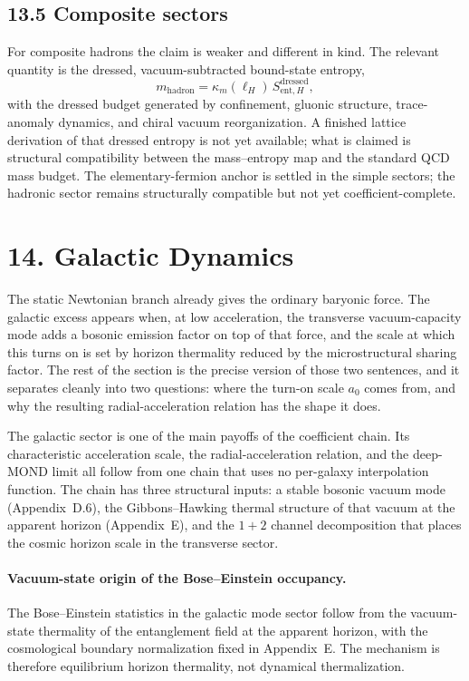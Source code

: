 \documentclass[11pt]{article}
\begin{document}
\subsection{13.5 Composite sectors}

For composite hadrons the claim is weaker and different in kind. The relevant quantity is the dressed, vacuum-subtracted bound-state entropy,
\[
m_{\mathrm{hadron}}=\kappa_m(\ell_H)\,S_{\mathrm{ent},H}^{\mathrm{dressed}},
\]
with the dressed budget generated by confinement, gluonic structure, trace-anomaly dynamics, and chiral vacuum reorganization. A finished lattice derivation of that dressed entropy is not yet available; what is claimed is structural compatibility between the mass--entropy map and the standard QCD mass budget. The elementary-fermion anchor is settled in the simple sectors; the hadronic sector remains structurally compatible but not yet coefficient-complete.

\section{14. Galactic Dynamics}

The static Newtonian branch already gives the ordinary baryonic force. The galactic excess appears when, at low acceleration, the transverse vacuum-capacity mode adds a bosonic emission factor on top of that force, and the scale at which this turns on is set by horizon thermality reduced by the microstructural sharing factor. The rest of the section is the precise version of those two sentences, and it separates cleanly into two questions: where the turn-on scale $a_0$ comes from, and why the resulting radial-acceleration relation has the shape it does.

The galactic sector is one of the main payoffs of the coefficient chain. Its characteristic acceleration scale, the radial-acceleration relation, and the deep-MOND limit all follow from one chain that uses no per-galaxy interpolation function. The chain has three structural inputs: a stable bosonic vacuum mode (Appendix~D.6), the Gibbons--Hawking thermal structure of that vacuum at the apparent horizon (Appendix~E), and the $1+2$ channel decomposition that places the cosmic horizon scale in the transverse sector.

\paragraph{Vacuum-state origin of the Bose--Einstein occupancy.}
The Bose--Einstein statistics in the galactic mode sector follow from the vacuum-state thermality of the entanglement field at the apparent horizon, with the cosmological boundary normalization fixed in Appendix~E. The mechanism is therefore equilibrium horizon thermality, not dynamical thermalization.
\end{document}
